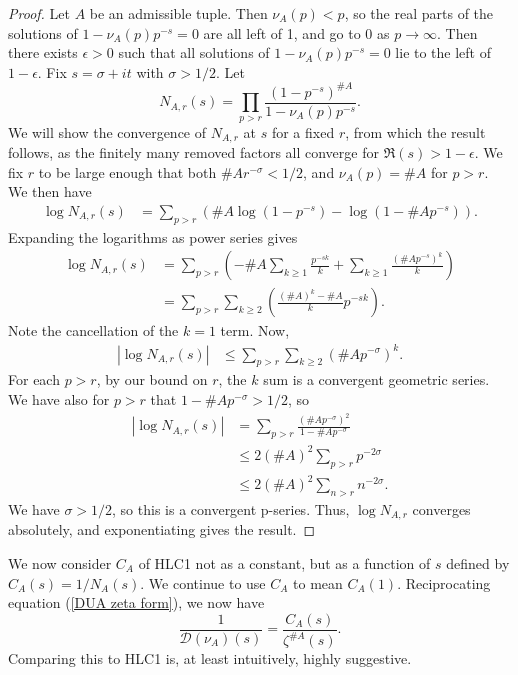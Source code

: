 \documentclass[11pt, leqno]{article}
\newcommand{\Di}{\mathcal{D}}
\begin{document}
\begin{proof}
    Let $A$ be an admissible tuple.
    Then $\nu_A(p) < p$, so the real parts of the solutions of $1-\nu_A(p)p^{-s}=0$ are all
    left of 1, and go to 0 as $p\rightarrow\infty$.
    Then there exists $\epsilon>0$ such that all solutions of $1-\nu_A(p)p^{-s}=0$
    lie to the left of $1-\epsilon$.
    Fix $s=\sigma + it$ with $\sigma>1/2$.
    Let 
    $$N_{A,r}(s) = \prod_{p>r}\frac{(1-p^{-s})^{\#A}}{1-\nu_A(p)p^{-s}}.$$
    We will show the convergence of $N_{A,r}$ at $s$ for a fixed $r$, from which 
    the result follows, as the finitely many removed factors all converge
    for $\Re(s)>1-\epsilon$.
    We fix $r$ to be large enough that both $\#Ar^{-\sigma} < 1/2$,
    and $\nu_A(p)=\#A$ for $p>r$.
    We then have
    \begin{align*}
        \log{N_{A, r}}(s) 
        &= \sum_{p>r}\left(\#A\log(1-p^{-s}) - \log(1-\#Ap^{-s})\right).
    \end{align*}
    Expanding the logarithms as power series gives
    \begin{align*}
        \log{N_{A,r}}(s) 
        &= \sum_{p>r}\left(
            -\#A\sum_{k\ge 1}\frac{p^{-sk}}{k} + 
            \sum_{k\ge 1}\frac{(\#Ap^{-s})^{k}}{k}\right) \\
        &= \sum_{p>r}\sum_{k\ge 2}\left(
            \frac{(\#A)^{k}-\#A}{k}p^{-sk}
            \right).
    \end{align*}
    Note the cancellation of the $k=1$ term.
    Now,
    \begin{align*}
        |\log{N_{A,r}}(s)| 
        &\le \sum_{p>r}\sum_{k\ge 2}
            \left(\#Ap^{-\sigma}\right)^k.
    \end{align*}
    For each $p>r$, by our bound on $r$, the $k$ sum is a convergent geometric series.
    We have also for $p>r$ that $1-\#Ap^{-\sigma} > 1/2$, so
    \begin{align*}
        |\log{N_{A,r}}(s)| 
        &= \sum_{p>r}\frac{(\#Ap^{-\sigma})^2}{1-\#Ap^{-\sigma}} \\
        &\le 2(\#A)^2\sum_{p>r}p^{-2\sigma} \\
        &\le 2(\#A)^2\sum_{n>r}n^{-2\sigma}.
    \end{align*}
    We have $\sigma > 1/2$, so this is a convergent p-series.
    Thus, $\log{N_{A,r}}$ converges absolutely, and exponentiating gives
    the result.
\end{proof}

We now consider $C_A$ of HLC1 not as a constant, but as a function of $s$
defined by $C_A(s)=1/N_A(s)$. 
We continue to use $C_A$ to mean $C_A(1)$.
Reciprocating equation (\ref{DUA zeta form}), we now have
$$\frac{1}{\Di(\nu_A)(s)} = \frac{C_A(s)}{\zeta^{\#A}(s)}.$$
Comparing this to HLC1 is, at least intuitively, highly suggestive.
\end{document}
